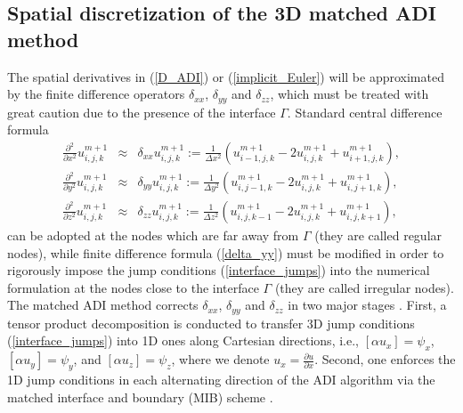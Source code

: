 \documentclass[dissertation]{uathesis}
\begin{document}
\begin{body}
\begin{flushleft}
\section{Spatial discretization of the 3D matched ADI method}
\hspace{1cm} The spatial derivatives in (\ref{D_ADI}) or (\ref{implicit_Euler}) will be approximated by the finite difference operators $\delta_{xx}$, $\delta_{yy}$ and $\delta_{zz}$, which must be treated with great caution due to the presence of the interface $\Gamma$. Standard central difference formula 
%
\begin{eqnarray} \label{delta_yy}
\frac{\partial^2}{\partial x^2}u^{m+1}_{i,j,k} & \approx &
\delta_{xx} u^{m+1}_{i,j,k} := \frac{1}{\Delta x^{2}} (u^{m+1}_{i-1,j,k} - 2 u^{m+1}_{i,j,k} + u^{m+1}_{i+1,j,k}), \nonumber \\
\frac{\partial^2}{\partial y^2}u^{m+1}_{i,j,k}& \approx &
\delta_{yy} u^{m+1}_{i,j,k} := \frac{1}{\Delta y^{2}} (u^{m+1}_{i,j-1,k} - 2 u^{m+1}_{i,j,k} + u^{m+1}_{i,j+1,k}), \\
\frac{\partial^2}{\partial z^2}u^{m+1}_{i,j,k} & \approx &
\delta_{zz} u^{m+1}_{i,j,k} := \frac{1}{\Delta z^{2}} (u^{m+1}_{i,j,k-1} - 2 u^{m+1}_{i,j,k} + u^{m+1}_{i,j,k+1}),	\nonumber
\end{eqnarray}
%
can be adopted at the nodes which are far away from $\Gamma$ (they are called regular nodes), while finite difference formula (\ref{delta_yy}) must be modified in order to rigorously impose the jump conditions (\ref{interface_jumps}) into the numerical formulation at the nodes close to the interface $\Gamma$ (they are called irregular nodes). 
The matched ADI method corrects $\delta_{xx}$, $\delta_{yy}$ and $\delta_{zz}$ in two major stages \cite{zhao2015matched,li2017matched}. 
First, a tensor product decomposition is conducted to transfer 3D jump conditions (\ref{interface_jumps}) into 1D ones along Cartesian directions, i.e.,
$[\alpha u_x]=\psi_x$,  $[\alpha u_y]=\psi_y$, and  $[\alpha u_z]=\psi_z$, 
where we denote $u_{x} = \frac{\partial u}{\partial x}$.
Second, one enforces the 1D jump conditions in each alternating direction of the ADI algorithm via the matched interface and boundary (MIB) scheme  \cite{zhao2004high, zhou2006high,yu2007three,yu2007matched}.



\end{flushleft}
\end{body}
\end{document}
